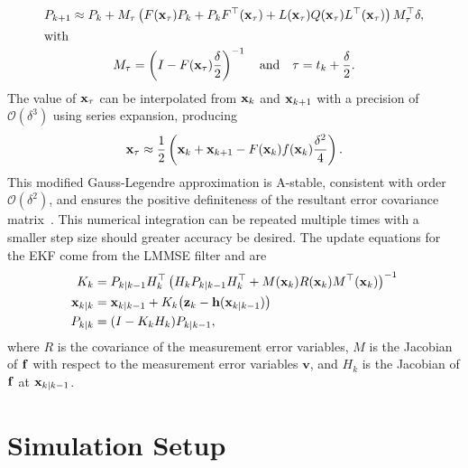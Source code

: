 \documentclass[../zhang_thesis.tex]{subfiles}
\begin{document}
\begin{gather}
    P_{k+1} \approx P_k + M_\tau \left( F(\mathbf{x}_\tau) P_k + P_k F^\top(\mathbf{x}_\tau) + L(\mathbf{x}_\tau) Q(\mathbf{x}_\tau) L^\top(\mathbf{x}_\tau) \right) M_\tau^\top \delta, \\
    \intertext{with}
    M_\tau = \left( I - F(\mathbf{x}_\tau) \frac{\delta}{2} \right)^{-1} \quad \text{and} \quad \tau = t_k + \frac{\delta}{2}.
\end{gather}
The value of $\mathbf{x}_\tau$ can be interpolated from $\mathbf{x}_k$ and $\mathbf{x}_{k+1}$ with a precision of $\mathcal{O}(\delta^3)$ using series expansion, producing
\begin{equation}
    \mathbf{x}_\tau \approx \frac{1}{2} \left( \mathbf{x}_k + \mathbf{x}_{k+1} - F(\mathbf{x}_k) f(\mathbf{x}_k) \frac{\delta^2}{4} \right).
\end{equation}
This modified Gauss-Legendre approximation is A-stable, consistent with order $\mathcal{O}(\delta^2)$, and ensures the positive definiteness of the resultant error covariance matrix~\cite{mazzoni07}. This numerical integration can be repeated multiple times with a smaller step size should greater accuracy be desired. The update equations for the EKF come from the LMMSE filter and are
\begin{align}
    K_k &= P_{k|k-1} H_k^\top \left( H_k P_{k|k-1} H_k^\top + M(\mathbf{x}_k) R(\mathbf{x}_k) M^\top(\mathbf{x}_k) \right)^{-1} \\
    \mathbf{x}_{k|k} &= \mathbf{x}_{k|k-1} + K_k \big( \mathbf{z}_k - \mathbf{h}(\mathbf{x}_{k|k-1}) \big) \\
    P_{k|k} &= (I - K_k H_k) P_{k|k-1},
\end{align}
where $R$ is the covariance of the measurement error variables, $M$ is the Jacobian of $\mathbf{f}$ with respect to the measurement error variables $\mathbf{v}$, and $H_k$ is the Jacobian of $\mathbf{f}$ at $\mathbf{x}_{k|k-1}$.

\section{Simulation Setup}
\end{document}
